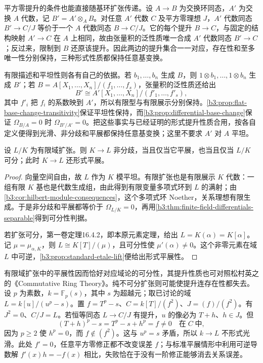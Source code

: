 平方零提升的条件也能直接随基环扩张传递。设 \(A\to B\) 为交换环同态，\(A'\) 为交换 \(A\) 代数，记 \(B'=A'\otimes_AB\)。对任意 \(A'\) 代数 \(C\) 及平方零理想 \(J\)，\(A'\) 代数同态 \(B'\to C/J\) 等价于一个 \(A\) 代数同态 \(B\to C/J\)。它的每个提升 \(B\to C\)，与固定的结构映射 \(A'\to C\) 在 \(A\) 上相同，故由张量积的泛性质唯一合成 \(A'\) 代数同态 \(B'\to C\)；反过来，限制到 \(B\) 还原该提升。因此两边的提升集合一一对应，存在性和至多唯一性分别保持，三种形式性质都保持任意基变换。

有限描述和平坦性则各有自己的依据。若 \(b_1,\ldots,b_n\) 生成 \(B\)，则 \(1\otimes b_1,\ldots,1\otimes b_n\) 生成 \(B'\)；若 \(B=A[X_1,\ldots,X_n]/(f_1,\ldots,f_s)\)，张量积的泛性质还给出
\[
	B'\cong A'[X_1,\ldots,X_n]/(f'_1,\ldots,f'_s),
\]
其中 \(f'_i\) 把 \(f_i\) 的系数映到 \(A'\)，所以有限型与有限展示分别保持。\cref{b3:prop:flat-base-change-transitivity}保证平坦性保持，而\cref{b3:prop:differential-base-change}保证 \(\Omega_{B/A}=0\) 时 \(\Omega_{B'/A'}=0\)。把这些事实与已经证明的形式提升性质合用，按各自定义便得到光滑、非分歧和平展都保持任意基变换；这里不要求 \(A'\) 对 \(A\) 平坦。

\begin{corollary}\label{b3:cor:finite-field-extension-etale}
	设 \(L/K\) 为有限域扩张。则 \(K\to L\) 非分歧，当且仅当它平展，也当且仅当 \(L/K\) 可分；此时 \(K\to L\) 还形式平展。
\end{corollary}
\begin{proof}
	向量空间自由，故 \(L\) 作为 \(K\) 模平坦。有限扩张也是有限展示 \(K\) 代数：一组有限 \(K\) 基也是代数生成组，由此得到有限变量多项式环到 \(L\) 的满射；由\cref{b3:cor:hilbert-module-consequences}，这个多项式环 Noether，关系理想有限生成。于是非分歧和平展都等价于 \(\Omega_{L/K}=0\)，再用\cref{b3:thm:finite-field-differentials-separable}得到可分性判据。

	若扩张可分，第一卷定理16.4.2，即本原元素定理，给出 \(L=K(\alpha)=K[\alpha]\)。记 \(\mu=\mu_{\alpha,K}\)，则 \(L\cong K[T]/(\mu)\)，且可分性使 \(\mu'(\alpha)\ne0\)。这个非零元素在域 \(L\) 中可逆，\cref{b3:prop:standard-etale-lift}便给出形式平展性。
\end{proof}

有限域扩张中的平展性因而恰好对应域论的可分性，其提升性质也可对照松村英之的《Commutative Ring Theory》\cite[\S25, Theorem 25.3, pp. 195--196]{Matsumura1989CommutativeRingTheory}。纯不可分扩张则可能使提升连存在性都失去。设 \(p\) 为素数，\(k=\mathbb F_p(s)\)，其中 \(s\) 为超越元；取已讨论的域 \(L=k[u]/(u^p-s)\)。置 \(f=T^p-s\)、\(C=k[T]/(f^2)\)、\(J=(f)/(f^2)\)。有 \(J^2=0\)、\(C/J=L\)。若恒等同态 \(L\to C/J\) 有提升，\(u\) 的像必为 \(T+h\)、\(h\in J\)。但
\[
	(T+h)^p-s=T^p-s+h^p=f\ne0\quad\text{在}\;C\;\text{中},
\]
因为 \(p\ge2\) 使 \(h^p=0\)，而 \(f\notin(f^2)\)。这与 \(u^p=s\) 矛盾，所以 \(k\to L\) 不形式光滑。此处 \(f'=0\)，任意平方零修正都不改变误差 \(f\)；与标准平展情形中利用可逆导数解 \(f'(x)h=-f(x)\) 相比，失败恰在于没有一阶修正能够消去关系误差。
